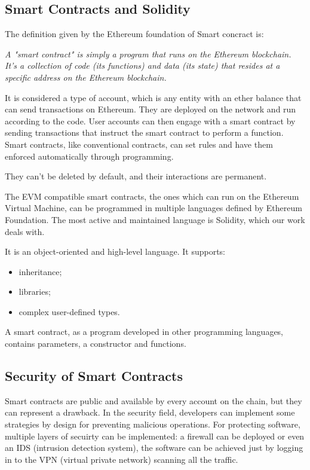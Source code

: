 \documentclass[a4paper,sigconf, language=french,
language=german, language=spanish, language=english]{acmart}
\begin{document}
\subsection{Smart Contracts and Solidity}
The definition given by the Ethereum foundation of Smart concract is:

\textit{A "smart contract" is simply a program that runs on the Ethereum blockchain. It's a collection of code (its functions) and data (its state) that resides at a specific address on the Ethereum blockchain.}

It is considered a type of account, which is any entity with an ether balance that can send transactions on Ethereum. 
They are deployed on the network and run according to the code. User accounts can then engage with a smart contract by sending transactions that instruct the smart contract to perform a function. 
Smart contracts, like conventional contracts, can set rules and have them enforced automatically through programming.

They can't be deleted by default, and their interactions are permanent. 

The EVM compatible smart contracts, the ones which can run on the Ethereum Virtual Machine, can be programmed in multiple languages defined by Ethereum Foundation. The most active and maintained language is Solidity, which our work deals with. 

It is an object-oriented and high-level language. It supports:
\begin{itemize}
  \item inheritance;
  \item libraries;
  \item complex user-defined types.
\end{itemize}

A smart contract, as a program developed in other programming languages, contains parameters, a constructor and functions.

\subsection{Security of Smart Contracts}
Smart contracts are public and available by every account on the chain, but they can represent a drawback. In the security field, developers can implement some strategies by design for preventing malicious operations. For protecting software, multiple layers of secuirty can be implemented: a firewall can be deployed or even an IDS (intrusion detection system), the software can be achieved just by logging in to the VPN (virtual private network) scanning all the traffic.
\end{document}
